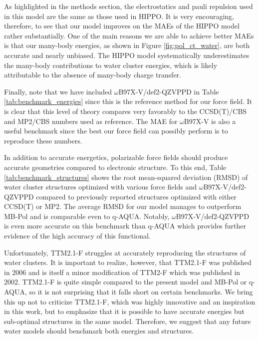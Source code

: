 \documentclass[journal=jacsat,manuscript=article]{achemso}
\begin{document}
As highlighted in the methods section, the electrostatics and pauli repulsion used in this
model are the same as those used in HIPPO.\cite{rackers2021polarizable} It is very encouraging,
therefore, to see that our model improves on the MAEs of the HIPPO model rather substantially.
One of the main reasons we are able to achieve better MAEs is that our many-body energies, as shown
in Figure \ref{fig:pol_ct_water}, are both accurate and nearly unbiased. The HIPPO model systematically
underestimates the many-body contributions to water cluster energies\cite{rackers2021polarizable},
which is likely attributable to the absence of many-body charge transfer.

Finally, note that we have included $\omega$B97X-V/def2-QZVPPD in Table \ref{tab:benchmark_energies} since
this is the reference method for our force field. It is clear that this level of theory
compares very favorably to the CCSD(T)/CBS and MP2/CBS numbers used as reference. The MAE for
$\omega$B97X-V is also a useful benchmark since the best our force field can possibly perform
is to reproduce these numbers.

In addition to accurate energetics, polarizable force fields should produce accurate geometries
compared to electronic structure. To this end, Table \ref{tab:benchmark_structures} shows the root mean-squared
deviation (RMSD) of water cluster structures optimized with various force fields and $\omega$B97X-V/def2-QZVPPD
compared to previously reported structures optimized with either CCSD(T) or MP2.\cite{herman2023extensive}
The average RMSD for our model manages to outperform MB-Pol and is comparable even to
q-AQUA. Notably, $\omega$B97X-V/def2-QZVPPD is even more accurate on this benchmark than q-AQUA
which provides further evidence of the high accuracy of this functional.

Unfortunately, TTM2.1-F struggles at accurately reproducing the structures of water clusters. It is important
to realize, however, that TTM2.1-F was published in 2006\cite{fanourgakis2006flexible} and
is itself a minor modification of TTM2-F which was published in 2002.\cite{burnham2002development}
TTM2.1-F is quite simple compared to the present model and MB-Pol or q-AQUA, so it is not
surprising that it falls short on certain benchmarks. We bring this up not to criticize TTM2.1-F, which
was highly innovative and an inspiration in this work, but to emphasize that it is possible to have accurate
energies but sub-optimal structures in the same model. Therefore, we suggest that any future water models should
benchmark both energies and structures.
\end{document}
